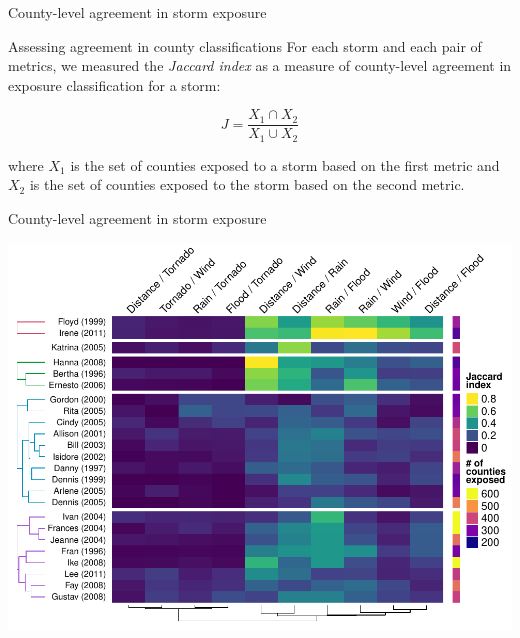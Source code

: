 \documentclass[ignorenonframetext,]{beamer}
\begin{document}
\begin{frame}{County-level agreement in storm exposure}

\begin{block}{Assessing agreement in county classifications}
For each storm and each pair of metrics, we measured the \textit{Jaccard index} as a measure of county-level agreement in exposure classification for a storm:

\begin{equation*}
J = \frac{X_1 \cap X_2}{X_1 \cup X_2}
\end{equation*}

where $X_1$ is the set of counties exposed to a storm based on the first metric and $X_2$ is the set of counties exposed to the storm based on the second metric. 

\end{block}

\end{frame}

\begin{frame}{County-level agreement in storm exposure}

\vspace{-0.3cm}

\begin{center}\includegraphics[height=0.87\textheight]{jaccard_heatmap_presentation} \end{center}

\end{frame}
\end{document}
